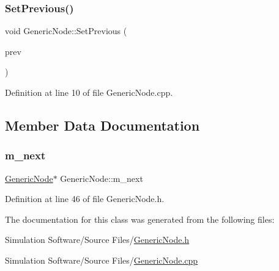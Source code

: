 \subsubsection{\texorpdfstring{Set\+Previous()}{SetPrevious()}}
{\footnotesize\ttfamily void Generic\+Node\+::\+Set\+Previous (\begin{DoxyParamCaption}\item[{\hyperlink{class_generic_node}{Generic\+Node} $\ast$}]{prev }\end{DoxyParamCaption})}



Definition at line 10 of file Generic\+Node.\+cpp.



\subsection{Member Data Documentation}
\mbox{\label{class_generic_node_af1d326d888b277b40d55b3c67be446d7}} 
\subsubsection{\texorpdfstring{m\+\_\+next}{m\_next}}
{\footnotesize\ttfamily \hyperlink{class_generic_node}{Generic\+Node}$\ast$ Generic\+Node\+::m\+\_\+next\hspace{0.3cm}{\ttfamily [protected]}}



Definition at line 46 of file Generic\+Node.\+h.



The documentation for this class was generated from the following files\+:\begin{DoxyCompactItemize}
\item 
Simulation Software/\+Source Files/\hyperlink{_generic_node_8h}{Generic\+Node.\+h}\item 
Simulation Software/\+Source Files/\hyperlink{_generic_node_8cpp}{Generic\+Node.\+cpp}\end{DoxyCompactItemize}
